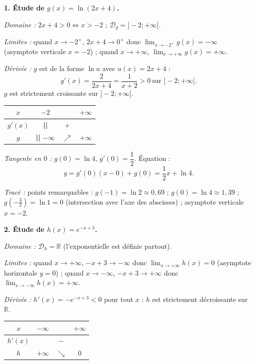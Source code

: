 \documentclass[11pt]{article}
\begin{document}
\begin{corrige}
\textbf{1. Étude de $g(x)=\ln(2x+4)$.}

\emph{Domaine :} $2x+4>0 \iff x>-2$ ; $\mathcal{D}_g=]-2;+\infty[$.

\emph{Limites :} quand $x\to -2^+$, $2x+4\to 0^+$ donc $\displaystyle\lim_{x\to -2^+}g(x)=-\infty$ (asymptote verticale $x=-2$) ; quand $x\to+\infty$, $\displaystyle\lim_{x\to+\infty}g(x)=+\infty$.

\emph{Dérivée :} $g$ est de la forme $\ln u$ avec $u(x)=2x+4$ :
\[ g'(x)=\frac{2}{2x+4}=\frac{1}{x+2}>0 \ \text{sur } ]-2;+\infty[. \]
$g$ est strictement croissante sur $]-2;+\infty[$.

\begin{center}
\begin{tabular}{|c|ccc|}\hline
$x$ & $-2$ & & $+\infty$ \\ \hline
$g'(x)$ & \textbf{||} & $+$ & \\ \hline
$g$ & \textbf{||} $-\infty$ & $\nearrow$ & $+\infty$ \\ \hline
\end{tabular}
\end{center}

\emph{Tangente en $0$ :} $g(0)=\ln 4$, $g'(0)=\dfrac{1}{2}$. Équation :
\[ y = g'(0)(x-0)+g(0) = \frac{1}{2}x + \ln 4. \]

\emph{Tracé :} points remarquables : $g(-1)=\ln 2\approx 0{,}69$ ; $g(0)=\ln 4\approx 1{,}39$ ; $g(-\tfrac{3}{2})=\ln 1 = 0$ (intersection avec l'axe des abscisses) ; asymptote verticale $x=-2$.

\textbf{2. Étude de $h(x)=e^{-x+3}$.}

\emph{Domaine :} $\mathcal{D}_h=\mathbb{R}$ (l'exponentielle est définie partout).

\emph{Limites :} quand $x\to+\infty$, $-x+3\to-\infty$ donc $\displaystyle\lim_{x\to+\infty}h(x)=0$ (asymptote horizontale $y=0$) ; quand $x\to-\infty$, $-x+3\to+\infty$ donc $\displaystyle\lim_{x\to-\infty}h(x)=+\infty$.

\emph{Dérivée :} $h'(x)=-e^{-x+3}<0$ pour tout $x$ : $h$ est strictement décroissante sur $\mathbb{R}$.

\begin{center}
\begin{tabular}{|c|ccc|}\hline
$x$ & $-\infty$ & & $+\infty$ \\ \hline
$h'(x)$ & & $-$ & \\ \hline
$h$ & $+\infty$ & $\searrow$ & $0$ \\ \hline
\end{tabular}
\end{center}


\end{corrige}
\end{document}
